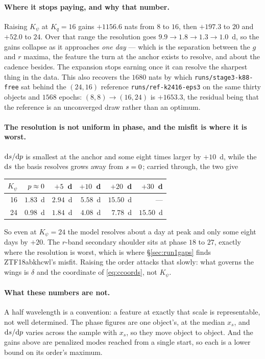 \documentclass[11pt]{article}
\newcommand{\file}[1]{\texttt{#1}}
\begin{document}
\paragraph{Where it stops paying, and why that number.} Raising $K_{\psi}$ at
$K_{q} = 16$ gains $+1156.6$ nats from $8$ to $16$, then $+197.3$ to $20$ and $+52.0$ to
$24$. Over that range the resolution goes $9.9 \to 1.8 \to 1.3 \to 1.0$~d, so the gains
collapse as it approaches \emph{one day} --- which is the separation between the $g$ and
$r$ maxima, the feature the turn at the anchor exists to resolve, and about the cadence
besides. The expansion stops earning once it can resolve the sharpest thing in the data.
This also recovers the $1680$ nats by which \file{runs/stage3-k88-free} sat behind the
$(24,16)$ reference \file{runs/ref-k2416-eps3} on the same thirty objects and $1568$
epochs: $(8,8) \to (16,24)$ is $+1653.3$, the residual being that the reference is an
unconverged draw rather than an optimum.

\paragraph{The resolution is not uniform in phase, and the misfit is where it is worst.}
$\mathrm{d}s/\mathrm{d}p$ is smallest at the anchor and some eight times larger by $+10$~d,
while the $\mathrm{d}s$ the basis resolves grows away from $s = 0$; carried through, the
two give

\medskip
\begin{tabular}{@{}r r r r r r@{}}
\toprule
$K_{\psi}$ & $p \approx 0$ & $+5$~d & $+10$~d & $+20$~d & $+30$~d \\
\midrule
16 & $1.83$~d & $2.94$~d & $5.58$~d & $15.50$~d & --- \\
24 & $0.98$~d & $1.84$~d & $4.08$~d & $ 7.78$~d & $15.50$~d \\
\bottomrule
\end{tabular}

\medskip\noindent
So even at $K_{\psi} = 24$ the model resolves about a day at peak and only some eight days
by $+20$. The $r$-band secondary shoulder sits at phase $18$ to $27$, exactly where the
resolution is worst, which is where \S\ref{sec:run1gaps} finds ZTF18abkhcwl's misfit.
Raising the order attacks that slowly: what governs the wings is $\delta$ and the
coordinate of \eqref{eq:ccoords}, not $K_{\psi}$.

\paragraph{What these numbers are not.} A half wavelength is a convention: a feature at
exactly that scale is representable, not well determined. The phase figures are one
object's, at the median $x_{s}$, and $\mathrm{d}s/\mathrm{d}p$ varies across the sample with
$x_{s}$, so they move object to object. And the gains above are penalized modes reached
from a single start, so each is a lower bound on its order's maximum.
\end{document}
